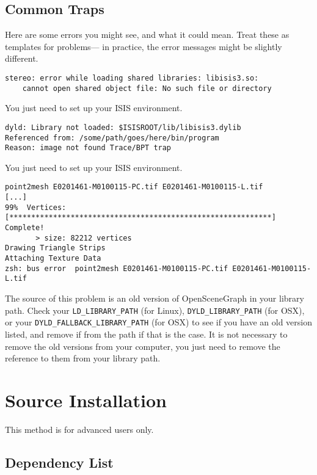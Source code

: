 \subsection{Common Traps}

Here are some errors you might see, and what it could mean. Treat
these as templates for problems--- in practice, the error messages might
be slightly different.

\begin{verbatim}
stereo: error while loading shared libraries: libisis3.so:
    cannot open shared object file: No such file or directory
\end{verbatim}

You just need to set up your ISIS environment.

\begin{verbatim}
dyld: Library not loaded: $ISISROOT/lib/libisis3.dylib
Referenced from: /some/path/goes/here/bin/program
Reason: image not found Trace/BPT trap
\end{verbatim}

You just need to set up your ISIS environment.

\begin{verbatim}
point2mesh E0201461-M0100115-PC.tif E0201461-M0100115-L.tif
[...]
99%  Vertices:   [************************************************************] Complete!
       > size: 82212 vertices
Drawing Triangle Strips
Attaching Texture Data
zsh: bus error  point2mesh E0201461-M0100115-PC.tif E0201461-M0100115-L.tif
\end{verbatim}

The source of this problem is an old version of OpenSceneGraph in
your library path. Check your \verb#LD_LIBRARY_PATH# (for Linux),
\verb#DYLD_LIBRARY_PATH# (for OSX), or your \verb#DYLD_FALLBACK_LIBRARY_PATH#
(for OSX) to see if you have an old version listed, and remove if
from the path if that is the case. It is not necessary to remove the
old versions from your computer, you just need to remove the reference
to them from your library path.

\section{\label{sec:Source-Installation}Source Installation}

This method is for advanced users only.

\subsection{Dependency List}

